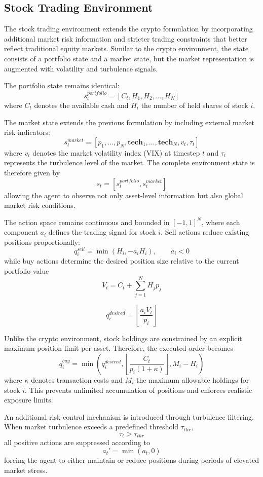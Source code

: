\subsection{Stock Trading Environment}

The stock trading environment extends the crypto formulation by incorporating additional 
market risk information and stricter trading constraints that better reflect traditional 
equity markets. Similar to the crypto environment, the state consists of a portfolio state 
and a market state, but the market representation is augmented with volatility and turbulence
signals.

The portfolio state remains identical:
\[
s_t^{portfolio}
=
[C_t,H_1,H_2,\dots,H_N]
\]
where $C_t$ denotes the available cash and $H_i$ the number of held shares of stock $i$.

The market state extends the previous formulation by including external market risk indicators:
\[
s_t^{market}
=
[p_1,\dots,p_N,
\mathbf{tech}_1,
\dots,
\mathbf{tech}_N,
v_t,
\tau_t]
\]
where $v_t$ denotes the market volatility index (VIX) at timestep $t$ and $\tau_t$ represents
the turbulence level of the market. The complete environment state is therefore given by
\[
s_t=
[s_t^{portfolio},s_t^{market}]
\]
allowing the agent to observe not only asset-level information but also global market risk
conditions.

The action space remains continuous and bounded in $[-1,1]^N$, where each component $a_i$
defines the trading signal for stock $i$. Sell actions reduce existing positions proportionally:
\[
q_i^{sell}
=
\min(H_i,-a_iH_i),
\qquad a_i<0
\]
while buy actions determine the desired position size relative to the current portfolio value
\[
V_t
=
C_t+\sum_{j=1}^{N}H_jp_j
\]

\[
q_i^{desired}
=
\left\lfloor
\frac{a_iV_t}{p_i}
\right\rfloor
\]

Unlike the crypto environment, stock holdings are constrained by an explicit maximum position
limit per asset. Therefore, the executed order becomes
\[
q_i^{buy}
=
\min\left(
q_i^{desired},
\left\lfloor
\frac{C_t}{p_i(1+\kappa)}
\right\rfloor,
M_i-H_i
\right)
\]
where $\kappa$ denotes transaction costs and $M_i$ the maximum allowable holdings for stock
$i$. This prevents unlimited accumulation of positions and enforces realistic exposure limits.

An additional risk-control mechanism is introduced through turbulence filtering. When market
turbulence exceeds a predefined threshold $\tau_{thr}$,
\[
\tau_t>\tau_{thr}
\]
all positive actions are suppressed according to
\[
a_t'=\min(a_t,0)
\]
forcing the agent to either maintain or reduce positions during periods of elevated market
stress.

